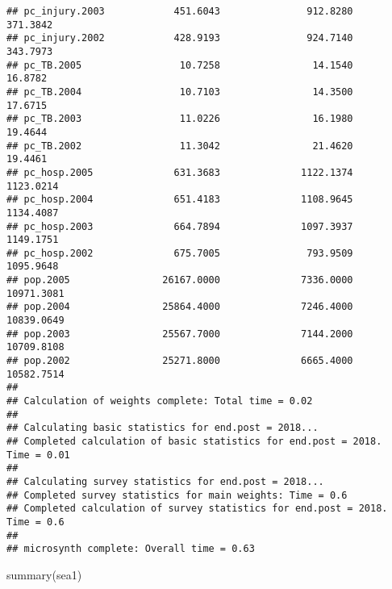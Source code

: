 \documentclass[
]{article}
\newenvironment{Shaded}{\begin{snugshade}}{\end{snugshade}}
\newcommand{\FunctionTok}[1]{\textcolor[rgb]{0.00,0.00,0.00}{#1}}
\newcommand{\NormalTok}[1]{#1}
\begin{document}
\begin{verbatim}
## pc_injury.2003            451.6043               912.8280   371.3842
## pc_injury.2002            428.9193               924.7140   343.7973
## pc_TB.2005                 10.7258                14.1540    16.8782
## pc_TB.2004                 10.7103                14.3500    17.6715
## pc_TB.2003                 11.0226                16.1980    19.4644
## pc_TB.2002                 11.3042                21.4620    19.4461
## pc_hosp.2005              631.3683              1122.1374  1123.0214
## pc_hosp.2004              651.4183              1108.9645  1134.4087
## pc_hosp.2003              664.7894              1097.3937  1149.1751
## pc_hosp.2002              675.7005               793.9509  1095.9648
## pop.2005                26167.0000              7336.0000 10971.3081
## pop.2004                25864.4000              7246.4000 10839.0649
## pop.2003                25567.7000              7144.2000 10709.8108
## pop.2002                25271.8000              6665.4000 10582.7514
## 
## Calculation of weights complete: Total time = 0.02
## 
## Calculating basic statistics for end.post = 2018...
## Completed calculation of basic statistics for end.post = 2018.  Time = 0.01
## 
## Calculating survey statistics for end.post = 2018...
## Completed survey statistics for main weights: Time = 0.6
## Completed calculation of survey statistics for end.post = 2018.  Time = 0.6
## 
## microsynth complete: Overall time = 0.63
\end{verbatim}

\begin{Shaded}
\begin{Highlighting}[]
\FunctionTok{summary}\NormalTok{(sea1)}
\end{Highlighting}
\end{Shaded}
\end{document}
